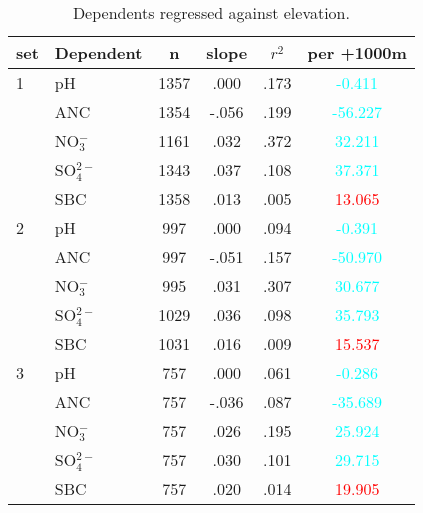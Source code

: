 \begin{table}[htbp]\scriptsize
\centering
\caption[Elevation trends]{Dependents regressed against elevation.}
\begin{tabular}{llcccc}
\toprule
set & Dependent & n & slope&$r^2$&per +1000m \\ 
\midrule
1   & pH               & 1357 & .000 & .173 & \textcolor{cyan}{-0.411} \\ 
     & ANC            & 1354 & -.056 & .199 & \textcolor{cyan}{-56.227}  \\ 
     &  NO$_3^-$ & 1161 & .032 & .372 & \textcolor{cyan}{32.211}  \\ 
     &  SO$_4^{2-}$& 1343 & .037 & .108 & \textcolor{cyan}{37.371}  \\ 
     & SBC             & 1358 & .013 & .005 & \textcolor{red}{13.065} \\ 
\midrule
2   & pH               & 997 & .000 & .094 & \textcolor{cyan}{-0.391}  \\ 
     & ANC            & 997 & -.051 & .157 & \textcolor{cyan}{-50.970} \\ 
     &  NO$_3^-$  & 995 & .031 & .307 & \textcolor{cyan}{30.677}  \\ 
     &  SO$_4^{2-}$ & 1029 & .036 & .098 & \textcolor{cyan}{35.793}  \\ 
     & SBC             & 1031 & .016 & .009 & \textcolor{red}{15.537}  \\ 
 \midrule
3   & pH              & 757 & .000 & .061 & \textcolor{cyan}{-0.286}  \\ 
     & ANC           & 757 & -.036 & .087 & \textcolor{cyan}{-35.689}  \\ 
     &  NO$_3^-$ & 757 & .026 & .195 & \textcolor{cyan}{25.924}  \\ 
     &  SO$_4^{2-}$ & 757 & .030 & .101 & \textcolor{cyan}{29.715}  \\ 
     & SBC            & 757 & .020 & .014 & \textcolor{red}{19.905}  \\ 
 \bottomrule
\end{tabular}
\label{Water quality per elevation}
\end{table}
